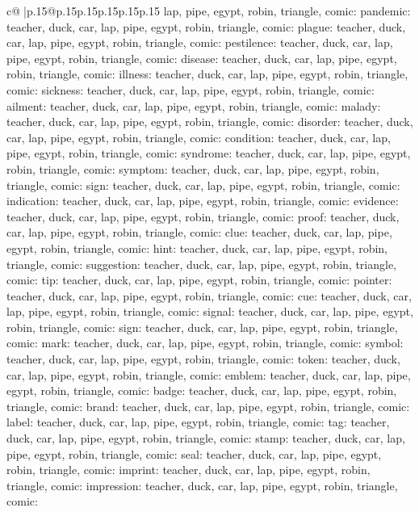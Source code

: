 \documentclass{article}
\begin{document}
{\begin{supertabular}{c@{$\;$}|p{.15\linewidth}@{}p{.15\linewidth}p{.15\linewidth}p{.15\linewidth}p{.15\linewidth}p{.15\linewidth}}
{{{lap, pipe, egypt, robin, triangle, comic\n\nCLUE: pandemic\nTARGETS: teacher, duck, car, lap, pipe, egypt, robin, triangle, comic\n\nCLUE: plague\nTARGETS: teacher, duck, car, lap, pipe, egypt, robin, triangle, comic\n\nCLUE: pestilence\nTARGETS: teacher, duck, car, lap, pipe, egypt, robin, triangle, comic\n\nCLUE: disease\nTARGETS: teacher, duck, car, lap, pipe, egypt, robin, triangle, comic\n\nCLUE: illness\nTARGETS: teacher, duck, car, lap, pipe, egypt, robin, triangle, comic\n\nCLUE: sickness\nTARGETS: teacher, duck, car, lap, pipe, egypt, robin, triangle, comic\n\nCLUE: ailment\nTARGETS: teacher, duck, car, lap, pipe, egypt, robin, triangle, comic\n\nCLUE: malady\nTARGETS: teacher, duck, car, lap, pipe, egypt, robin, triangle, comic\n\nCLUE: disorder\nTARGETS: teacher, duck, car, lap, pipe, egypt, robin, triangle, comic\n\nCLUE: condition\nTARGETS: teacher, duck, car, lap, pipe, egypt, robin, triangle, comic\n\nCLUE: syndrome\nTARGETS: teacher, duck, car, lap, pipe, egypt, robin, triangle, comic\n\nCLUE: symptom\nTARGETS: teacher, duck, car, lap, pipe, egypt, robin, triangle, comic\n\nCLUE: sign\nTARGETS: teacher, duck, car, lap, pipe, egypt, robin, triangle, comic\n\nCLUE: indication\nTARGETS: teacher, duck, car, lap, pipe, egypt, robin, triangle, comic\n\nCLUE: evidence\nTARGETS: teacher, duck, car, lap, pipe, egypt, robin, triangle, comic\n\nCLUE: proof\nTARGETS: teacher, duck, car, lap, pipe, egypt, robin, triangle, comic\n\nCLUE: clue\nTARGETS: teacher, duck, car, lap, pipe, egypt, robin, triangle, comic\n\nCLUE: hint\nTARGETS: teacher, duck, car, lap, pipe, egypt, robin, triangle, comic\n\nCLUE: suggestion\nTARGETS: teacher, duck, car, lap, pipe, egypt, robin, triangle, comic\n\nCLUE: tip\nTARGETS: teacher, duck, car, lap, pipe, egypt, robin, triangle, comic\n\nCLUE: pointer\nTARGETS: teacher, duck, car, lap, pipe, egypt, robin, triangle, comic\n\nCLUE: cue\nTARGETS: teacher, duck, car, lap, pipe, egypt, robin, triangle, comic\n\nCLUE: signal\nTARGETS: teacher, duck, car, lap, pipe, egypt, robin, triangle, comic\n\nCLUE: sign\nTARGETS: teacher, duck, car, lap, pipe, egypt, robin, triangle, comic\n\nCLUE: mark\nTARGETS: teacher, duck, car, lap, pipe, egypt, robin, triangle, comic\n\nCLUE: symbol\nTARGETS: teacher, duck, car, lap, pipe, egypt, robin, triangle, comic\n\nCLUE: token\nTARGETS: teacher, duck, car, lap, pipe, egypt, robin, triangle, comic\n\nCLUE: emblem\nTARGETS: teacher, duck, car, lap, pipe, egypt, robin, triangle, comic\n\nCLUE: badge\nTARGETS: teacher, duck, car, lap, pipe, egypt, robin, triangle, comic\n\nCLUE: brand\nTARGETS: teacher, duck, car, lap, pipe, egypt, robin, triangle, comic\n\nCLUE: label\nTARGETS: teacher, duck, car, lap, pipe, egypt, robin, triangle, comic\n\nCLUE: tag\nTARGETS: teacher, duck, car, lap, pipe, egypt, robin, triangle, comic\n\nCLUE: stamp\nTARGETS: teacher, duck, car, lap, pipe, egypt, robin, triangle, comic\n\nCLUE: seal\nTARGETS: teacher, duck, car, lap, pipe, egypt, robin, triangle, comic\n\nCLUE: imprint\nTARGETS: teacher, duck, car, lap, pipe, egypt, robin, triangle, comic\n\nCLUE: impression\nTARGETS: teacher, duck, car, lap, pipe, egypt, robin, triangle, comic\n\nCLUE: }}}
\end{supertabular}}
\end{document}
